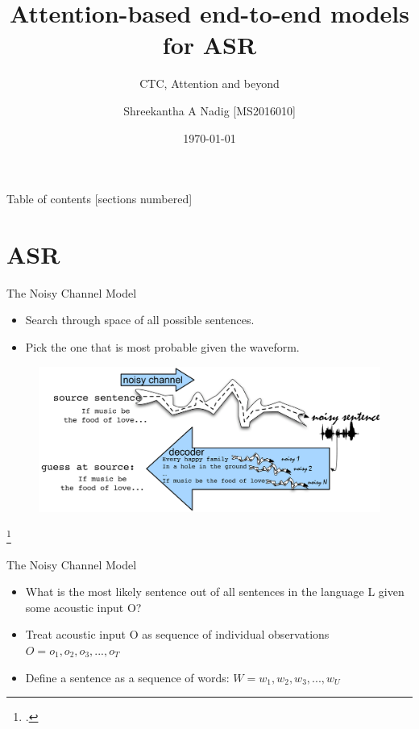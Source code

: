 \documentclass[10pt]{beamer}
\title{Attention-based end-to-end models for ASR}
\subtitle{CTC, Attention and beyond}
\date{\today}
\author{Shreekantha A Nadig [MS2016010]}
\institute{Under the guidance of \\
	Prof. V.Ramasubramanian \\
	Prof. Sachit Rao}
\begin{document}
	
\maketitle


\begin{frame}{Table of contents}
[sections numbered]
\tableofcontents[hideallsubsections]
\end{frame}

\section{ASR}
\begin{frame}[fragile]{The Noisy Channel Model}
\begin{itemize}
	\item Search through space of all possible sentences.
	\item Pick the one that is most probable given the waveform.
\end{itemize}
\begin{figure}
	\includegraphics[width=\linewidth]{./images/page-04.png}
\end{figure}
\footcite{4767370}
\end{frame}


\begin{frame}[fragile]{The Noisy Channel Model}
\begin{itemize}
	\item What is the most likely sentence out of all sentences in the language L given some acoustic input O?
	\item Treat acoustic input O as sequence of individual observations $O = o_1, o_2, o_3, ... , o_T$
	\item Define a sentence as a sequence of words: $W = w_1, w_2, w_3, ... , w_U$
\end{itemize}
\end{frame}
\end{document}
